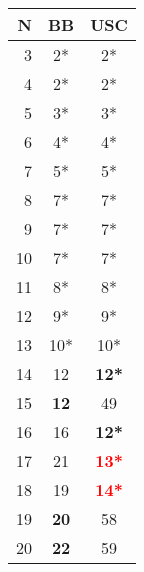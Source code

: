 \begin{tabular}{r|c|c}
 N&BB &USC\\
 \hline
 3&2*&2*\\
 4&2*&2*\\
 5&3*&3*\\
 6&4*&4*\\
 7&5*&5*\\
 8&7*&7*\\
 9&7*&7*\\
 10&7*&7*\\
 11&8*&8*\\
 12&9*&9*\\
 13&10*&10*\\
 14&12&\textbf{12*}\\
 15&\textbf{12}&49\\
 16&16&\textbf{12*}\\
 17&21&\textbf{\textcolor{red}{13*}}\\
 18&19&\textbf{\textcolor{red}{14*}}\\
 19&\textbf{20}&58\\
 20&\textbf{22}&59\\\hline
\end{tabular}

